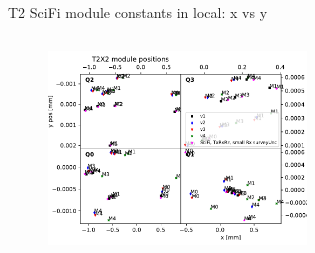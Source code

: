 \documentclass[aspectratio=1610, 12pt]{beamer}
\begin{document}
\begin{frame}{T2 SciFi module constants in local: x vs y}
\begin{columns}
\begin{column}[c]{0.5\textwidth}
\begin{figure}
        \includegraphics[width=0.61\textwidth]{plots/out_x_y_pos/retest_x_vs_y_local_T2X2.pdf}
      \end{figure}
    \end{column}
  \end{columns}
\end{frame}
\end{document}
